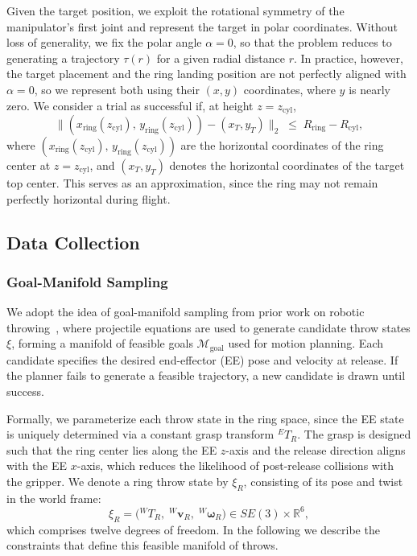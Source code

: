 \documentclass[letterpaper, 10 pt, conference]{ieeeconf}  %
\begin{document}
Given the target position, we exploit the rotational symmetry of the manipulator’s first joint and represent the target in polar coordinates. 
Without loss of generality, we fix the polar angle $\alpha=0$, so that the problem reduces to generating a trajectory $\tau(r)$ for a given radial distance $r$. In practice, however, the target placement and the ring landing position are not perfectly aligned with $\alpha=0$, so we represent both using their $(x,y)$ coordinates, where $y$ is nearly zero.
We consider a trial as successful if, at height $z=z_{\mathrm{cyl}}$, 
\begin{equation}
  \big\| (x_{\mathrm{ring}}(z_{\mathrm{cyl}}),\, y_{\mathrm{ring}}(z_{\mathrm{cyl}})) - (x_T, y_T) \big\|_2
  \;\le\; R_{\mathrm{ring}} - R_{\mathrm{cyl}} ,
\end{equation}
where $(x_{\mathrm{ring}}(z_{\mathrm{cyl}}),\, y_{\mathrm{ring}}(z_{\mathrm{cyl}}))$ are the horizontal coordinates of the ring center at $z=z_{\mathrm{cyl}}$, and $(x_T, y_T)$ denotes the horizontal coordinates of the target top center.
This serves as an approximation, since the ring may not remain perfectly horizontal during flight.

\subsection{Data Collection}
\subsubsection{Goal-Manifold Sampling}
We adopt the idea of goal-manifold sampling from prior work on robotic throwing~\cite{zhang2012icra, pekarovskiy2013goalmanifold}, 
where projectile equations are used to generate candidate throw states $\xi$, forming a manifold of feasible goals $\mathcal{M}_{\text{goal}}$ used for motion planning. 
Each candidate specifies the desired end-effector (EE) pose and velocity at release.
If the planner fails to generate a feasible trajectory, a new candidate is drawn until success.

Formally, we parameterize each throw state in the ring space, since the EE state is uniquely determined via a constant grasp transform ${}^E T_R$. 
The grasp is designed such that the ring center lies along the EE $z$-axis and the release direction aligns with the EE $x$-axis, which reduces the likelihood of post-release collisions with the gripper.
We denote a ring throw state by $\xi_R$, consisting of its pose and twist in the world frame:
\[
\xi_R = \big({}^W T_R,\; {}^W \mathbf{v}_R,\; {}^W \boldsymbol{\omega}_R\big) \in SE(3)\times\mathbb{R}^6,
\]
which comprises twelve degrees of freedom. 
In the following we describe the constraints that define this feasible manifold of throws.
\end{document}
